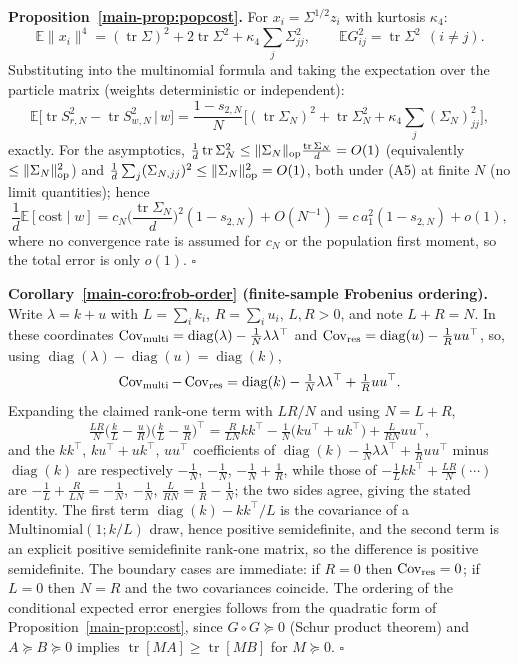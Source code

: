 \textbf{Proposition~\ref{main-prop:popcost}.} For $x_i=\Sigma^{1/2}z_i$ with kurtosis $\kappa_4$:
\[
\mathbb E\|x_i\|^4=(\operatorname{tr}\Sigma)^2+2\operatorname{tr}\Sigma^2+\kappa_4\sum_j\Sigma_{jj}^2,\qquad \mathbb EG_{ij}^2=\operatorname{tr}\Sigma^2\ \ (i\neq j).
\]
Substituting into the multinomial formula and taking the expectation over the particle matrix (weights deterministic or independent):
\[
\mathbb E\big[\operatorname{tr}S_{r,N}^2-\operatorname{tr}S_{w,N}^2\,\big|\,w\big]=\frac{1-s_{2,N}}{N}\Big[(\operatorname{tr}\Sigma_N)^2+\operatorname{tr}\Sigma_N^2+\kappa_4\sum_j(\Sigma_N)_{jj}^2\Big],
\]
exactly. For the asymptotics, $\frac1d\operatorname{tr}\Sigma_N^2\le\|\Sigma_N\|_{\rm op}\frac{\operatorname{tr}\Sigma_N}{d}=O(1)$ (equivalently $\le\|\Sigma_N\|_{\rm op}^2$) and $\frac1d\sum_j(\Sigma_{N,jj})^2\le\|\Sigma_N\|_{\rm op}^2=O(1)$, both under (A5) at finite $N$ (no limit quantities); hence
\[
\frac1d\mathbb E[\mathrm{cost}\mid w]=c_N\Big(\frac{\operatorname{tr}\Sigma_N}{d}\Big)^2(1-s_{2,N})+O(N^{-1})=c\,a_1^2(1-s_{2,N})+o(1),
\]
where no convergence rate is assumed for $c_N$ or the population first moment, so the total error is only $o(1)$. $\square$

\textbf{Corollary~\ref{main-coro:frob-order} (finite-sample Frobenius ordering).}
Write $\lambda=k+u$ with $L=\sum_ik_i$, $R=\sum_iu_i$, $L,R>0$, and note
$L+R=N$. In these coordinates
$\operatorname{Cov}_{\rm multi}=\operatorname{diag}(\lambda)-\frac1N\lambda\lambda^\top$
and
$\operatorname{Cov}_{\rm res}=\operatorname{diag}(u)-\frac1R uu^\top$,
so, using $\operatorname{diag}(\lambda)-\operatorname{diag}(u)=\operatorname{diag}(k)$,
\[
\operatorname{Cov}_{\rm multi}-\operatorname{Cov}_{\rm res}
=\operatorname{diag}(k)-\tfrac1N\lambda\lambda^\top+\tfrac1R uu^\top.
\]
Expanding the claimed rank-one term with $LR/N$ and using $N=L+R$,
\[
\tfrac{LR}{N}\big(\tfrac kL-\tfrac uR\big)\big(\tfrac kL-\tfrac uR\big)^\top
=\tfrac{R}{LN}kk^\top-\tfrac1N\big(ku^\top+uk^\top\big)+\tfrac{L}{RN}uu^\top,
\]
and the $kk^\top$, $ku^\top+uk^\top$, $uu^\top$ coefficients of
$\operatorname{diag}(k)-\frac1N\lambda\lambda^\top+\frac1Ruu^\top$
minus $\operatorname{diag}(k)$ are respectively $-\frac1N$, $-\frac1N$,
$-\frac1N+\frac1R$, while those of
$-\frac1L kk^\top+\frac{LR}{N}(\cdots)$ are
$-\frac1L+\frac{R}{LN}=-\frac1N$, $-\frac1N$, $\frac{L}{RN}=\frac1R-\frac1N$;
the two sides agree, giving the stated identity. The first term
$\operatorname{diag}(k)-kk^\top/L$ is the covariance of a
$\mathrm{Multinomial}(1;k/L)$ draw, hence positive semidefinite, and the
second term is an explicit positive semidefinite rank-one matrix, so the
difference is positive semidefinite. The boundary cases are immediate: if
$R=0$ then $\operatorname{Cov}_{\rm res}=0$; if $L=0$ then $N=R$ and the two
covariances coincide. The ordering of the conditional expected error energies
follows from the quadratic form of Proposition~\ref{main-prop:cost}, since
$G\circ G\succeq0$ (Schur product theorem) and
$A\succeq B\succeq0$ implies $\operatorname{tr}[MA]\ge\operatorname{tr}[MB]$
for $M\succeq0$. $\square$

